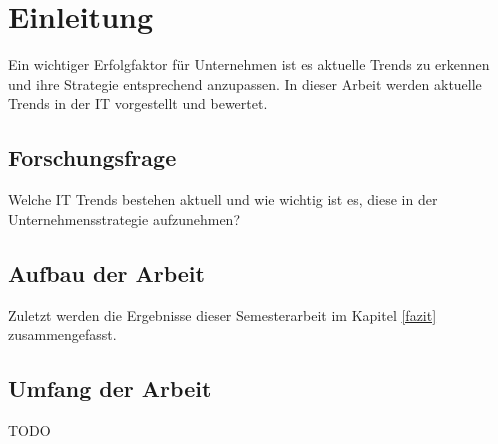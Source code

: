 \newpage
\section{Einleitung} \label{Einleitung}
Ein wichtiger Erfolgfaktor für Unternehmen ist es aktuelle Trends zu erkennen
und ihre Strategie entsprechend anzupassen. In dieser Arbeit werden aktuelle
Trends in der IT vorgestellt und bewertet.


\subsection{Forschungsfrage}
Welche IT Trends bestehen aktuell und wie wichtig ist es, diese in der
Unternehmensstrategie aufzunehmen?

\subsection{Aufbau der Arbeit}

Zuletzt werden die Ergebnisse dieser Semesterarbeit im Kapitel \ref{fazit} zusammengefasst.

\subsection{Umfang der Arbeit}

TODO
